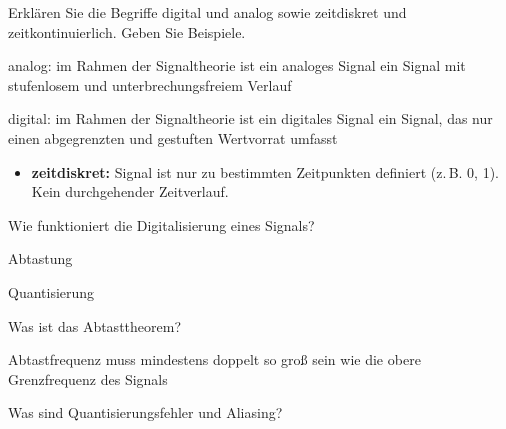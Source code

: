 \documentclass
[
  draft    = true,
  fontsize = 11pt,
  parskip  = half-,
  BCOR     = 0pt,
  DIV      = 11,
  ngerman,
  dvipsnames
]
{scrartcl}
\begin{document}
\begin{mytemize}
\begin{achim}
\begin{center}
          \end{center}
        \end{achim}
  \item Erklären Sie die Begriffe \glqq{}digital\grqq{} und \glqq{}analog\grqq{} sowie \glqq{}zeitdiskret\grqq{} und \glqq{}zeitkontinuierlich\grqq. Geben Sie Beispiele. 
        \begin{achim}
          \begin{mytemize}
            \item analog: im Rahmen der Signaltheorie ist ein analoges Signal ein Signal mit stufenlosem und unterbrechungsfreiem Verlauf
            \item digital: im Rahmen der Signaltheorie ist ein digitales Signal ein Signal, das nur einen abgegrenzten und gestuften Wertvorrat umfasst
          \end{mytemize}
        \end{achim}
        \begin{moritz}
        \begin{itemize}
                \item[]\textbf{zeitdiskret:} Signal ist nur zu bestimmten Zeitpunkten definiert (z.\,B. 0, 1). Kein durchgehender Zeitverlauf.
        \end{itemize}
        \end{moritz}
  \item Wie funktioniert die Digitalisierung eines Signals? 
        \begin{achim}
          \begin{mytemize}
            \item Abtastung
            \item Quantisierung
          \end{mytemize}
        \end{achim}
  \item Was ist das Abtasttheorem? 
        \begin{achim}
          \begin{mytemize}
            \item Abtastfrequenz muss mindestens doppelt so groß sein wie die obere Grenzfrequenz des Signals
          \end{mytemize}
        \end{achim}
  \item Was sind Quantisierungsfehler und Aliasing? 

\end{mytemize}
\end{document}
